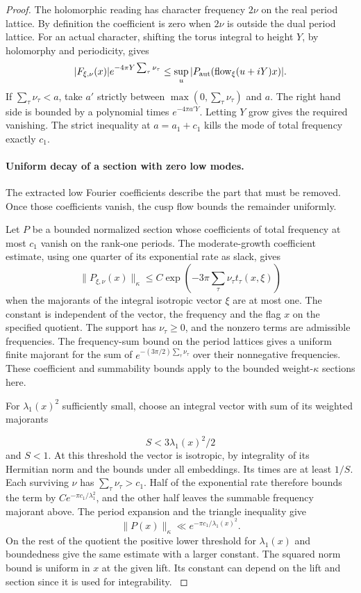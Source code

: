 \begin{proof}
The holomorphic reading has character frequency
\(2\nu\) on the real period lattice. By definition the
coefficient is zero when \(2\nu\) is outside the dual
period lattice. For an actual character, shifting the torus
integral to height \(Y\), by holomorphy and periodicity,
gives
\[
 |F_{\xi,\nu}(x)|e^{-4\pi Y\sum_\tau\nu_\tau}
     \le \sup_u |P_{\rm aut}(\operatorname{flow}_\xi(u+iY)x)|.
\]
If \(\sum_\tau\nu_\tau<a\), take \(a'\) strictly between
\(\max(0,\sum_\tau\nu_\tau)\) and \(a\). The right hand
side is bounded by a polynomial times
\(e^{-4\pi a'Y}\). Letting \(Y\) grow gives the required
vanishing. The strict inequality at \(a=a_1+c_1\) kills
the mode of total frequency exactly \(c_1\).
\label{cor:slice-short-analytic-5}

\paragraph{Uniform decay of a section with zero low modes.}
\label{par:slice-cusp-decay}

The extracted low Fourier coefficients describe the part that must be removed. Once those coefficients vanish, the cusp flow bounds the remainder uniformly.

Let \(P\) be a bounded normalized section whose coefficients
of total frequency at most \(c_1\) vanish on the rank-one
periods. The moderate-growth coefficient estimate, using
one quarter of its exponential rate as slack, gives
\[
 \|P_{\xi,\nu}(x)\|_\kappa
 \le C \exp\!\left(-3\pi\sum_\tau\nu_\tau
                                      t_\tau(x,\xi)\right)
\]
when the majorants of the integral isotropic vector \(\xi\)
are at most one. The constant is independent of the vector,
the frequency and the flag \(x\) on the specified quotient.
The support has \(\nu_\tau\ge0\), and the nonzero terms are
admissible frequencies. The frequency-sum bound on the
period lattices gives a uniform finite majorant for the sum
of \(e^{-(3\pi/2)\sum_\tau\nu_\tau}\) over their nonnegative
frequencies. These coefficient and summability bounds apply
to the bounded weight-\(\kappa\) sections here.

For \(\lambda_1(x)^2\) sufficiently small, choose an integral
vector with sum of its weighted majorants

\[
  S<3\lambda_1(x)^2/2
\]
 and \(S<1\).
At this threshold the vector is isotropic, by integrality
of its Hermitian norm and the bounds under all embeddings.
Its times are at least \(1/S\). Each surviving \(\nu\) has
\(\sum_\tau\nu_\tau>c_1\). Half of the exponential rate
therefore bounds the term by \(C e^{-\pi c_1/\lambda_1^2}\),
and the other half leaves the summable frequency majorant
above. The period expansion and the triangle inequality
give \[
 \|P(x)\|_\kappa\ll e^{-\pi c_1/\lambda_1(x)^2}.
\]
On the rest of the quotient the positive lower threshold
for \(\lambda_1(x)\) and boundedness give the same estimate
with a larger constant. The squared norm bound is uniform
in \(x\) at the given lift. Its constant can depend on the
lift and section since it is used for integrability.
\label{cor:slice-short-analytic-6}


\end{proof}
